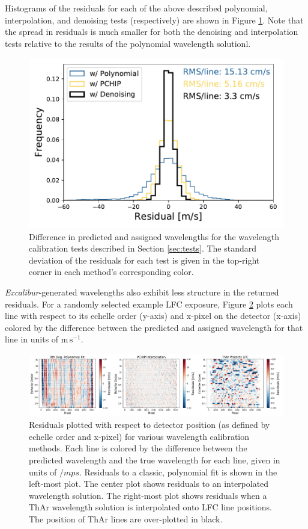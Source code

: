 \documentclass[12pt, onecolumn]{aastex63}
\newcommand{\project}[1]{\textsl{#1}}
\newcommand{\name}{\project{Excalibur}}
\newcommand{\mps}{\mathrm{m\,s^{-1}}}
\begin{document}
Histograms of the residuals for each of the above described polynomial, interpolation, and denoising tests (respectively) are shown in Figure \ref{fig:testHists}.  Note that the spread in residuals is much smaller for both the denoising and interpolation tests relative to the results of the polynomial wavelength solutionl.

\begin{figure}[h]
\centering
\includegraphics[width=.5\textwidth]{Figures/all_results.pdf}
\caption{Difference in predicted and assigned wavelengths for the wavelength calibration tests described in Section \ref{sec:tests}.  The standard deviation of the residuals for each test is given in the top-right corner in each method's corresponding color.}
\label{fig:testHists}
\end{figure} 

\name -generated wavelengths also exhibit less structure in the returned residuals.  For a randomly selected example LFC exposure, Figure \ref{fig:resid2d} plots each line with respect to its echelle order (y-axis) and x-pixel on the detector (x-axis) colored by the difference between the predicted and assigned wavelength for that line in units of $\mps$.

\begin{figure}[t]
\centering
\includegraphics[width=\textwidth]{Figures/lineResids2D.png}
\caption{Residuals plotted with respect to detector position (as defined by echelle order and x-pixel) for various wavelength calibration methods.  Each line is colored by the difference between the predicted wavelength and the true wavelength for each line, given in units of $/mps$.  Residuals to a classic, polynomial fit is shown in the left-most plot.  The center plot shows residuals to an interpolated wavelength solution.  The right-most plot shows residuals when a ThAr wavelength solution is interpolated onto LFC line positions.  The position of ThAr lines are over-plotted in black.}
\label{fig:resid2d}
\end{figure}
\end{document}
